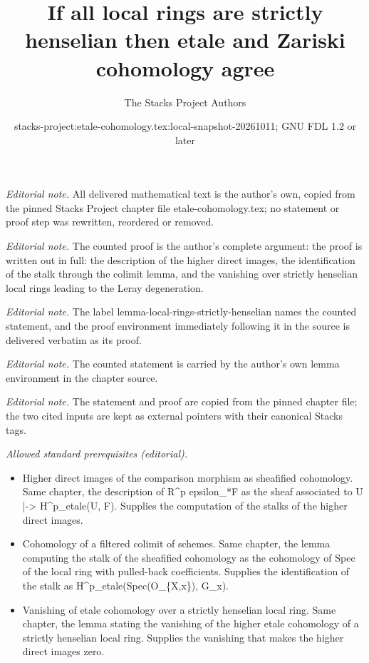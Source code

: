 \documentclass[10pt,a4paper]{amsart}
\title{If all local rings are strictly henselian then etale and Zariski cohomology agree}
\author{The Stacks Project Authors}
\date{stacks-project:etale-cohomology.tex:local-snapshot-20261011; GNU FDL 1.2 or later}
\theoremstyle{plain}
\theoremstyle{definition}
\theoremstyle{remark}
\numberwithin{equation}{subsection}
\begin{document}
\maketitle
\noindent\textit{Editorial note.} All delivered mathematical text is the author's own, copied from the pinned Stacks Project chapter file etale-cohomology.tex; no statement or proof step was rewritten, reordered or removed.\par\medskip
\noindent\textit{Editorial note.} The counted proof is the author's complete argument: the proof is written out in full: the description of the higher direct images, the identification of the stalk through the colimit lemma, and the vanishing over strictly henselian local rings leading to the Leray degeneration.\par\medskip
\noindent\textit{Editorial note.} The label lemma-local-rings-strictly-henselian names the counted statement, and the proof environment immediately following it in the source is delivered verbatim as its proof.\par\medskip
\noindent\textit{Editorial note.} The counted statement is carried by the author's own lemma environment in the chapter source.\par\medskip
\noindent\textit{Editorial note.} The statement and proof are copied from the pinned chapter file; the two cited inputs are kept as external pointers with their canonical Stacks tags.\par\medskip
\noindent\textit{Allowed standard prerequisites (editorial).}\begin{itemize}
\item Higher direct images of the comparison morphism as sheafified cohomology. Same chapter, the description of R\textasciicircum{}p epsilon\_*F as the sheaf associated to U |-> H\textasciicircum{}p\_etale(U, F). Supplies the computation of the stalks of the higher direct images.
\item Cohomology of a filtered colimit of schemes. Same chapter, the lemma computing the stalk of the sheafified cohomology as the cohomology of Spec of the local ring with pulled-back coefficients. Supplies the identification of the stalk as H\textasciicircum{}p\_etale(Spec(O\_\{X,x\}), G\_x).
\item Vanishing of etale cohomology over a strictly henselian local ring. Same chapter, the lemma stating the vanishing of the higher etale cohomology of a strictly henselian local ring. Supplies the vanishing that makes the higher direct images zero.
\end{itemize}\medskip
\end{document}
